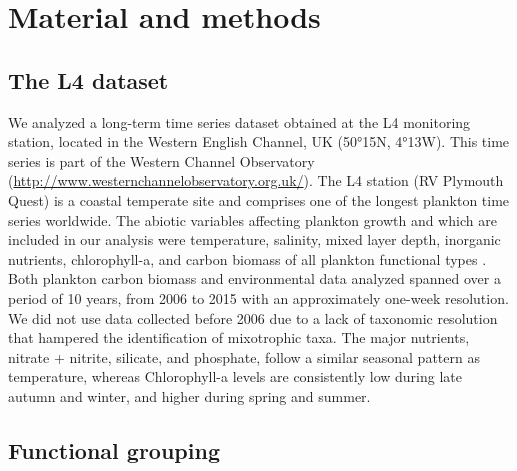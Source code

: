 \documentclass[12pt]{article}
\begin{document}
\section*{Material and methods}

\subsection*{The L4 dataset}

We analyzed a long-term time series dataset obtained at the L4 monitoring station, located in the Western English Channel, UK (50°15N, 4°13W). This time series is part of the Western Channel Observatory (\url{http://www.westernchannelobservatory.org.uk/}). The L4 station (RV Plymouth Quest) is a coastal temperate site and comprises one of the longest plankton time series worldwide. The abiotic variables affecting plankton growth and which are included in our analysis were temperature, salinity, mixed layer depth, inorganic nutrients, chlorophyll-a, and carbon biomass of all plankton functional types \citep{Smyth2010,Widdicombe2010,Atkinson2015,Tarran2015}. Both plankton carbon biomass and environmental data analyzed spanned over a period of 10 years, from 2006 to 2015 with an approximately one-week resolution. We did not use data collected before 2006 due to a lack of taxonomic resolution that hampered the identification of mixotrophic taxa. The major nutrients, nitrate + nitrite, silicate, and phosphate, follow a similar seasonal pattern as temperature, whereas Chlorophyll-a levels are consistently low during late autumn and winter, and higher during spring and summer.

\subsection*{Functional grouping}
\end{document}
